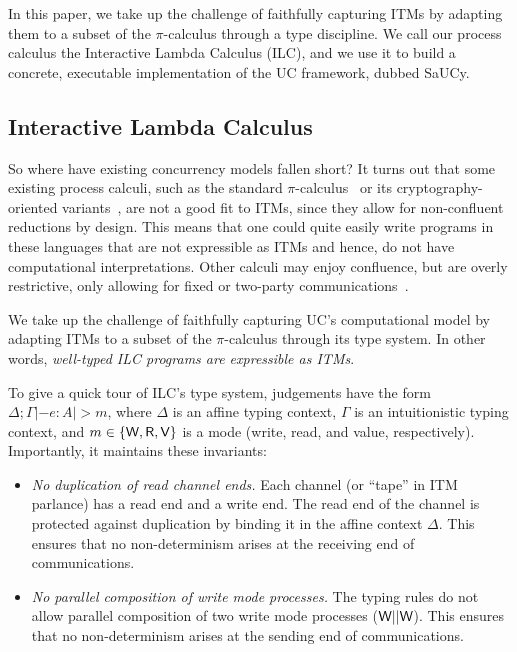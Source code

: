 In this paper, we take up the challenge of faithfully capturing ITMs by adapting
them to a subset of the $\pi$-calculus through a type discipline. We call our
process calculus the Interactive Lambda Calculus (ILC), and we use it to build a
concrete, executable implementation of the UC framework, dubbed SaUCy.


\subsection{Interactive Lambda Calculus}

So where have existing concurrency models fallen short?  It turns out that some
existing process calculi, such as the standard
$\pi$-calculus~\cite{milner1999communicating} or its cryptography-oriented
variants~\cite{abadi1999calculus, abadi2001mobile}, are not a good fit to ITMs,
since they allow for non-confluent reductions by design. This means that one
could quite easily write programs in these languages that are not expressible as
ITMs and hence, do not have computational interpretations. Other calculi may
enjoy confluence, but are overly restrictive, only allowing for fixed or
two-party
communications~\cite{kobayashi1999linearity,bohl2016symbolic,fowler2018session}.

We take up the challenge of faithfully capturing UC's computational model by
adapting ITMs to a subset of the $\pi$-calculus through its type system. In other
words, \emph{well-typed ILC programs are expressible as ITMs}.

To give a quick tour of ILC's type system, judgements have the form $\Delta ; \Gamma |- e
: A |> m$, where $\Delta$ is an affine typing context, $\Gamma$ is an intuitionistic typing
context, and $m \in \{\textsf{W}, \textsf{R}, \textsf{V}\}$ is a mode (write, read, and value,
respectively). Importantly, it maintains these invariants:

\begin{itemize}[leftmargin=*]
\item \emph{No duplication of read channel ends.} Each channel (or ``tape'' in
  ITM parlance) has a read end and a write end. The read end of the channel is
  protected against duplication by binding it in the affine context $\Delta$. This
  ensures that no non-determinism arises at the receiving end of communications.

\item \emph{No parallel composition of write mode processes.} The typing rules
  do not allow parallel composition of two write mode processes ($\textsf{W} ||
  \textsf{W}$). This ensures that no non-determinism arises at the sending end of
  communications.
\end{itemize}

